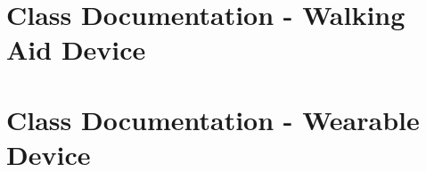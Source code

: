                 \newpage

    \section{Class Documentation - Walking Aid Device}
    \label{sec:class_documentation_walk_aid}\mbox{}

        
        \newpage
        
        \newpage
        
        \newpage
        
        \newpage
        
        \newpage

    \section{Class Documentation - Wearable Device}
    \label{sec:class_documentation_wearable}\mbox{}

        
        \newpage
        
        \newpage
        
        \newpage